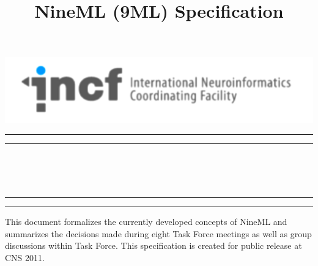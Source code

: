 \documentclass{article}
\begin{document}
\pagestyle{empty}

\begin{center}
{\includegraphics[width=0.7\columnwidth]{images/incf.png}}
\end{center}

\vspace*{1cm}

\noindent\rule{\columnwidth}{1pt}
\noindent\rule{\columnwidth}{2pt}

\vspace*{1cm}

\begin{center}
\\
\vspace{0.5cm}
\\
\vspace{0.5cm}
\\
\vspace{0.5cm}
\end{center}

\vspace*{0.75cm}

\noindent\rule{\columnwidth}{2pt}
\noindent\rule{\columnwidth}{1pt}

\vspace*{3cm}


\title{NineML (9ML) Specification}

\newpage
\pagestyle{plain}

\tableofcontents
\newpage

\abstract
This document formalizes the currently developed concepts of NineML and
summarizes the decisions made during eight Task Force meetings as well
as group discussions within Task Force. This specification is created for
public release at CNS 2011.
\end{document}
